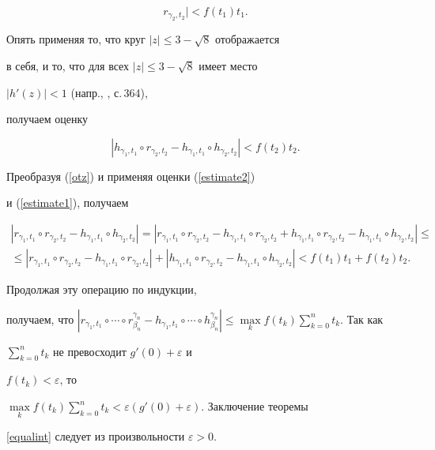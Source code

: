 \begin{pf}
\begin{equation}
r_{\gamma_2,t_2}|<f(t_1)t_1.


\end{equation}


Опять применяя то, что круг $|z|\leqslant3-\sqrt{8}$ отображается


в себя, и то, что для всех $|z|\leqslant3-\sqrt{8}$ имеет место


$|h'(z)|<1$ (напр., \cite{Goluzin}, с.\,364),


получаем оценку


\begin{equation}


\label{estimate1} |h_{\gamma_1,t_1}\circ


r_{\gamma_2,t_2}-h_{\gamma_1,t_1}\circ


h_{\gamma_2,t_2}|<f(t_2)t_2.


\end{equation}


Преобразуя (\ref{otz}) и применяя оценки (\ref{estimate2})


и (\ref{estimate1}), получаем


\begin{multline*}


|r_{\gamma_1,t_1}\circ r_{\gamma_2,t_2}-h_{\gamma_1,t_1}\circ


h_{\gamma_2,t_2}|=|r_{\gamma_1,t_1}\circ r_{\gamma_2,t_2}-


h_{\gamma_1,t_1}\circ r_{\gamma_2,t_2}+ 


h_{\gamma_1,t_1}\circ r_{\gamma_2,t_2}-h_{\gamma_1,t_1}\circ


h_{\gamma_2,t_2}|\leqslant \\


%


\leqslant |r_{\gamma_1,t_1}\circ


r_{\gamma_2,t_2}-h_{\gamma_1,t_1}\circ r_{\gamma_2,t_2}|+  


|h_{\gamma_1,t_1}\circ r_{\gamma_2,t_2}-h_{\gamma_1,t_1}\circ


h_{\gamma_2,t_2}|<f(t_1)t_1+f(t_2)t_2.


\end{multline*}


Продолжая эту операцию по индукции,


получаем, что $|r_{\gamma_1,t_1}\circ\dotsb\circ r_{\beta_n}^{


\gamma_n}-h_{\gamma_1,t_1}\circ\dotsb\circ


h_{\beta_n}^{\gamma_n}|\leqslant


\max\limits_{k}f(t_k)\sum\limits_{k=0}^{n}t_k$. Так как


$\sum\limits_{k=0}^{n} t_k$ не превосходит $g'(0)+\varepsilon$ и


$f(t_k)<\varepsilon$, то


$\max\limits_{k}f(t_k)\sum\limits_{k=0}^{n}t_k<


\varepsilon(g'(0)+\varepsilon)$. Заключение теоремы


\ref{equalint} следует из произвольности $\varepsilon>0$.


\end{pf}





